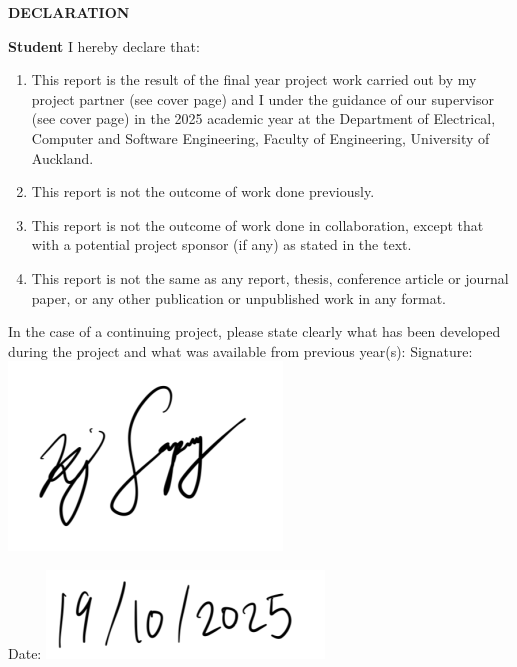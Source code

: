 \documentclass[12pt, a4paper, ukenglish]{article}
\begin{document}
% 
\clearpage
\newpage
\vspace{2em}
\begin{center}
\Large\textbf{DECLARATION}
\end{center}
\noindent
\textbf{Student}
\vspace{1em}
I hereby declare that:
\begin{enumerate}
    \item This report is the result of the final year project work carried out by my project partner (see cover page) and I under the guidance of our supervisor (see cover page) in the 2025 academic year at the Department of Electrical, Computer and Software Engineering, Faculty of Engineering, University of Auckland. 
    \item This report is not the outcome of work done previously. 
    \item This report is not the outcome of work done in collaboration, except that with a potential project sponsor (if any) as stated in the text.
    \item This report is not the same as any report, thesis, conference article or journal paper, or any other publication or unpublished work in any format. 
\end{enumerate}
\vspace{1em}
\noindent
In the case of a continuing project, please state clearly what has been developed during the project and what was available from previous year(s): 
\vspace{3cm}
\noindent
\newline
Signature:
\includegraphics[width=0.3\linewidth]{figures/signature.png}

\vspace{1cm}
Date: \includegraphics[width=0.2\linewidth]{figures/date.png}

\newpage

\setlength{\parskip}{6pt}
\renewcommand{\contentsname}{\large{Table of Contents}}
\tableofcontents
\newpage
\setlength{\parskip}{9pt}
\end{document}
